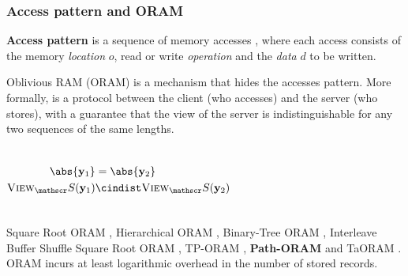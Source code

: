 	\begin{frame}[label={frame:appendix:oram}]

		\frametitle{Access pattern and ORAM}

		\justifying%

		\textbf{Access pattern} is a sequence of memory accesses \oramProgram{}, where each access consists of the memory \emph{location} $o$, read \oramRead{} or write \oramWrite{} \emph{operation} and the \emph{data} $d$ to be written.

		Oblivious RAM (ORAM) is a mechanism that hides the accesses pattern.
		More formally, \oram{} is a protocol between the client \client{} (who accesses) and the server \server{} (who stores), with a guarantee that the view of the server is indistinguishable for any two sequences of the same lengths.

		\begin{columns}[T]

				\[
					\begin{split}
						\abs{\oramProgram_1}					& = \abs{\oramProgram_2}							\\
						\textsc{View}_\server (\oramProgram_1)	& \cindist \textsc{View}_\server (\oramProgram_2)
					\end{split}
				\]



		\end{columns}

		\vspace*{1ex}

		Square Root ORAM \cite{oram-theory}, Hierarchical ORAM \cite{oram-original}, Binary-Tree ORAM \cite{binary-tree-oram}, Interleave Buffer Shuffle Square Root ORAM \cite{shortest-path-oram}, TP-ORAM \cite{tp-oram}, \textbf{Path-ORAM} \cite{path-oram} and TaORAM \cite{taostore}.
		\alert{ORAM incurs at least logarithmic overhead in the number of stored records. \cite{oram-original}}

		\begin{flushright}
			\hyperlink{frame:epsolute-motivation}{}
		\end{flushright}

	\end{frame}

